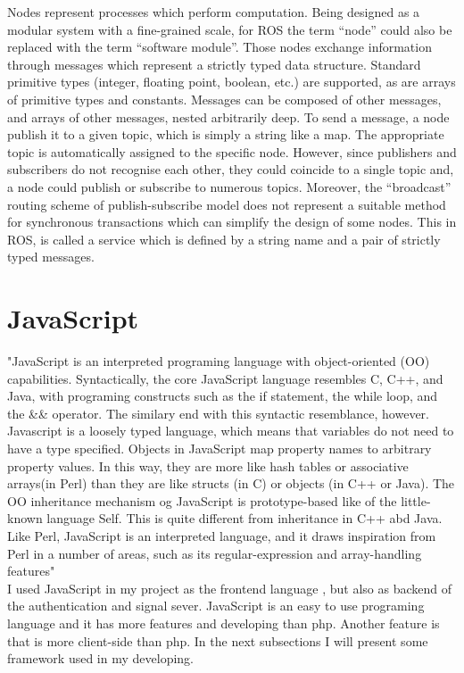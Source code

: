 Nodes represent processes which perform computation. Being designed as a modular system with a fine-grained scale, for ROS the term “node” could also be replaced with the term “software module”. Those nodes exchange information through messages which represent a strictly typed data structure. Standard primitive types (integer, floating point, boolean, etc.) are supported, as are arrays of primitive types and constants. Messages can be composed of other messages, and arrays of other messages, nested arbitrarily deep. To send a message, a node publish it to a given topic, which is simply a string like a map. The appropriate topic is automatically assigned to the specific node. However, since publishers and subscribers do not recognise each other, they could coincide to a single topic and, a node could publish or subscribe to numerous topics. Moreover, the “broadcast” routing scheme of publish-subscribe model does not represent a suitable method for synchronous transactions which can simplify the design of some nodes. This in ROS, is called a service which is defined by a string name and a pair of strictly typed messages. 


















\section{JavaScript}
\label{sec:javascript}
"JavaScript is an interpreted programing language with object-oriented (OO)
capabilities. Syntactically, the core JavaScript language resembles C, C++,
and Java, with programing constructs such as the if statement, the while loop,
and the \&\& operator. The similary end with this syntactic resemblance, however.
Javascript is a loosely typed language, which means that variables do not need
to have a type specified. Objects in JavaScript map property names to arbitrary property
values. In this way, they are more like hash tables or associative arrays(in Perl) than
they are like structs (in C) or objects (in C++ or Java). The OO inheritance mechanism
og JavaScript is prototype-based like of the little-known language Self. This is quite
different from inheritance in C++ abd Java. Like Perl, JavaScript is an interpreted
language, and it draws inspiration from Perl in a number of areas, such as its regular-expression
and array-handling features" \cite{flanagan2006javascript} \\
I used JavaScript in my project as the frontend language , but also as backend of the authentication and
signal sever. JavaScript is an easy to use programing language and it has more features and developing
than php. Another feature is that is more client-side than php. In the next subsections I will present
some framework used in my developing.


